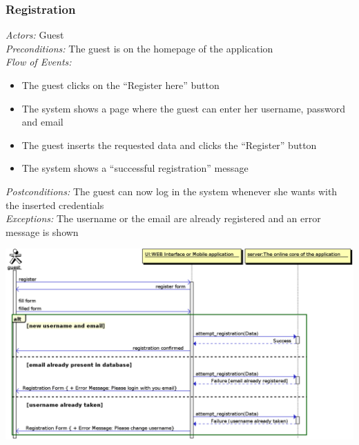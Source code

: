 \documentclass{article}
\begin{document}
\subsubsection{Registration}
\textit{Actors:} Guest
\\\textit{Preconditions:} The guest is on the homepage of the application
\\\textit{Flow of Events:}
\begin{itemize}
	\item  The guest clicks on the ``Register here'' button
	\item  The system shows a page where the guest can enter her username, password and email
	\item  The guest inserts the requested data and clicks the ``Register'' button
	\item  The system shows a ``successful registration'' message 
\end{itemize}
\textit{Postconditions:} The guest can now log in the system whenever she wants with the inserted credentials
\\\textit{Exceptions:} The username or the email are already registered and an error message is shown
\begin{center}	
	\includegraphics[width=\textwidth,keepaspectratio]{Sequence-Diagrams/registration}
\end{center}
\end{document}
